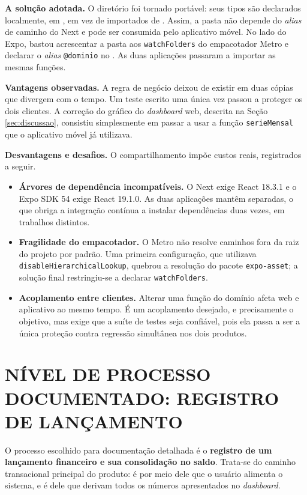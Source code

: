 \documentclass[12pt,a4paper]{article}
\begin{document}
\textbf{A solução adotada.} O diretório  foi tornado portável: seus tipos são declarados localmente, em , em vez de importados de . Assim, a pasta não depende do \textit{alias} de caminho do Next e pode ser consumida pelo aplicativo móvel. No lado do Expo, bastou acrescentar a pasta aos \texttt{watchFolders} do empacotador Metro e declarar o \textit{alias} \texttt{@dominio} no . As duas aplicações passaram a importar as mesmas funções.

\textbf{Vantagens observadas.} A regra de negócio deixou de existir em duas cópias que divergem com o tempo. Um teste escrito uma única vez passou a proteger os dois clientes. A correção do gráfico do \textit{dashboard} web, descrita na Seção \ref{sec:discussao}, consistiu simplesmente em passar a usar a função \texttt{serieMensal} que o aplicativo móvel já utilizava.

\textbf{Desvantagens e desafios.} O compartilhamento impõe custos reais, registrados a seguir.

\begin{itemize}
    \item \textbf{Árvores de dependência incompatíveis.} O Next exige React 18.3.1 e o Expo SDK 54 exige React 19.1.0. As duas aplicações mantêm  separadas, o que obriga a integração contínua a instalar dependências duas vezes, em trabalhos distintos.
    \item \textbf{Fragilidade do empacotador.} O Metro não resolve caminhos fora da raiz do projeto por padrão. Uma primeira configuração, que utilizava \texttt{disableHierarchicalLookup}, quebrou a resolução do pacote \texttt{expo-asset}; a solução final restringiu-se a declarar \texttt{watchFolders}.
    \item \textbf{Acoplamento entre clientes.} Alterar uma função do domínio afeta web e aplicativo ao mesmo tempo. É um acoplamento desejado, e precisamente o objetivo, mas exige que a suíte de testes seja confiável, pois ela passa a ser a única proteção contra regressão simultânea nos dois produtos.
\end{itemize}

\section{NÍVEL DE PROCESSO DOCUMENTADO: REGISTRO DE LANÇAMENTO}

O processo escolhido para documentação detalhada é o \textbf{registro de um lançamento financeiro e sua consolidação no saldo}. Trata-se do caminho transacional principal do produto: é por meio dele que o usuário alimenta o sistema, e é dele que derivam todos os números apresentados no \textit{dashboard}.
\end{document}
